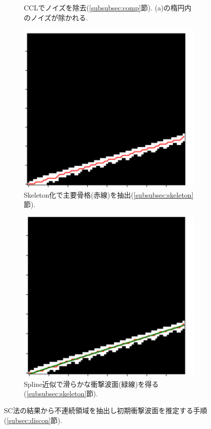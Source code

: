 \documentclass[a4j]{jarticle}
\begin{document}
\begin{figure}[h]
\begin{subfigure}[t]{0.23\textwidth}
    \caption{CCLでノイズを除去(\ref{subsubsec:comp}節). (a)の楕円内のノイズが除かれる.}
  \end{subfigure}
  \begin{subfigure}[t]{0.235\textwidth}
    \centering
    \includegraphics[width=\linewidth]{extractc.pdf}
    \caption{Skeleton化で主要骨格(赤線)を抽出(\ref{subsubsec:skeleton}節).}
  \end{subfigure}
  \hfill
  \begin{subfigure}[t]{0.23\textwidth}
    \centering
    \includegraphics[width=\linewidth]{extractd.pdf}
    \caption{Spline近似で滑らかな衝撃波面(緑線)を得る(\ref{subsubsec:skeleton}節).}
  \end{subfigure}

  \caption{SC法の結果から不連続領域を抽出し初期衝撃波面を推定する手順(\ref{subsec:discon}節).}
  \label{fig:extract}
\end{figure}
\end{document}

